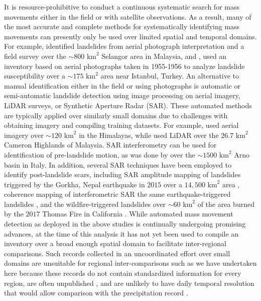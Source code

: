 \documentclass[nhess, manuscript]{copernicus}
\begin{document}
It is resource-prohibitive to conduct a continuous systematic search for mass movements either in the field or with satellite observations. As a result, many of the most accurate and complete methods for systematically identifying mass movements can presently only be used over limited spatial and temporal domains. For example, \citet{leeLandslideHazardMapping2007} identified landslides from aerial photograph interpretation and a field survey over the \(\sim800 \text{ km}^2\)
Selangor area in Malaysia, and \citet{nefesliogluAssessmentLandslideSusceptibility2010}, used an inventory based on aerial photographs taken in 1955-1956 to analyze landslide susceptibility over a \(\sim175 \text{ km}^2\) area near Istanbul, Turkey. An alternative to manual identification either in the field or using photographs is automatic or semi-automatic landslide detection using image processing on aerial imagery, LiDAR surveys, or Synthetic Aperture Radar (SAR). These automated methods are typically applied over similarly small domains due to challenges with obtaining imagery and compiling training datasets. For example, \citet{marthaLandslideHazardRisk2013} used aerial imagery over \(\sim120 \text{ km}^2\) in the Himalayas, while \citet{mezaalOptimizedNeuralArchitecture2017} used LiDAR over the \(26.7 \text{ km}^2\) Cameron Highlands of Malaysia. SAR interferometry can be used for identification of pre-landslide motion, as was done by \citet{luPersistentScatterersInterferometry2012} over the \(\sim1500 \text{ km}^2\) Arno basin in Italy. In addition, several SAR techniques have been employed to identify post-landslide scars, including SAR amplitude mapping of landslides triggered by the Gorkha, Nepal earthquake in \(2015\) over a \(14,500 \text{ km}^2\)
area \citep{meenaComparisonEarthquakeTriggeredLandslide2019}, coherence mapping of interferometric SAR the same earthquake-triggered landslides \citep{burrowsNewMethodLargeScale2019}, and the wildfire-triggered landslides over \(\sim60 \text{ km}^2\)
of the area burned by the \(2017\) Thomas Fire in California \citep{donnellanUAVSAROpticalAnalysis2018}. While automated mass movement detection as deployed in the above studies is continually undergoing promising advances, at the time of this analysis it has not yet been used to compile an inventory over a broad enough spatial domain to facilitate inter-regional comparisons. Such records collected in an uncoordinated effort over small domains are unsuitable for regional inter-comparisons such as we have undertaken here because these records do not contain standardized information for every region, are often unpublished \citep{vanwestenLandslideHazardRisk2006}, and are unlikely to have daily temporal resolution that would allow comparison with the precipitation record \citep{kirschbaumGlobalLandslideCatalog2010}.
\end{document}
